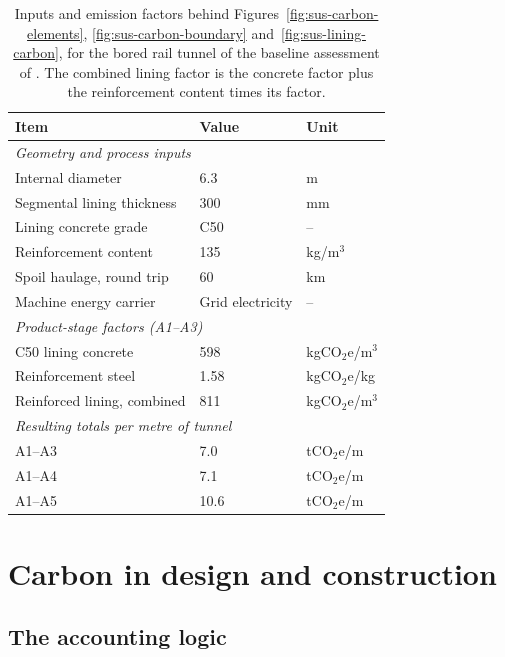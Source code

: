 \begin{table}[htbp]
\caption{Inputs and emission factors behind
Figures~\ref{fig:sus-carbon-elements}, \ref{fig:sus-carbon-boundary}
and~\ref{fig:sus-lining-carbon}, for the bored rail tunnel of the baseline
assessment of \citet{chen2024carbonbaseline}. The combined lining factor is
the concrete factor plus the reinforcement content times its factor.}
\label{tab:sus-emission-factors}
\centering
\small
\begin{tabularx}{\textwidth}{X l l}
\toprule
\textbf{Item} & \textbf{Value} & \textbf{Unit} \\
\midrule
\multicolumn{3}{l}{\emph{Geometry and process inputs}} \\
Internal diameter & 6.3 & m \\
Segmental lining thickness & 300 & mm \\
Lining concrete grade & C50 & -- \\
Reinforcement content & 135 & kg/m$^3$ \\
Spoil haulage, round trip & 60 & km \\
Machine energy carrier & Grid electricity & -- \\
\midrule
\multicolumn{3}{l}{\emph{Product-stage factors (A1--A3)}} \\
C50 lining concrete & 598 & kgCO$_2$e/m$^3$ \\
Reinforcement steel & 1.58 & kgCO$_2$e/kg \\
Reinforced lining, combined & 811 & kgCO$_2$e/m$^3$ \\
\midrule
\multicolumn{3}{l}{\emph{Resulting totals per metre of tunnel}} \\
A1--A3 & 7.0 & tCO$_2$e/m \\
A1--A4 & 7.1 & tCO$_2$e/m \\
A1--A5 & 10.6 & tCO$_2$e/m \\
\bottomrule
\end{tabularx}
\end{table}

\section{Carbon in design and construction}
\label{sec:carbon-in-design}

\subsection{The accounting logic}
\label{sec:carbon-formula}

